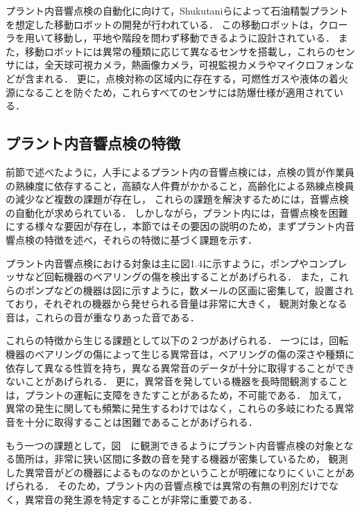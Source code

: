 \documentclass[../main]{subfiles}
\begin{document}
プラント内音響点検の自動化に向けて，Shukutaniらによって石油精製プラントを想定した移動ロボットの開発が行われている．
この移動ロボットは，クローラを用いて移動し，平地や階段を問わず移動できるように設計されている．
また，移動ロボットには異常の種類に応じて異なるセンサを搭載し，これらのセンサには，全天球可視カメラ，熱画像カメラ，可視監視カメラやマイクロフォンなどが含まれる．
更に，点検対称の区域内に存在する，可燃性ガスや液体の着火源になることを防ぐため，これらすべてのセンサには防爆仕様が適用されている．

\subsection{プラント内音響点検の特徴}
\label{sec:intro_plant_characteristics}

前節で述べたように，人手によるプラント内の音響点検には，点検の質が作業員の熟練度に依存すること，高額な人件費がかかること，高齢化による熟練点検員の減少など複数の課題が存在し，
これらの課題を解決するためには，音響点検の自動化が求められている．
しかしながら，プラント内には，音響点検を困難にする様々な要因が存在し，本節ではその要因の説明のため，まずプラント内音響点検の特徴を述べ，それらの特徴に基づく課題を示す．

プラント内音響点検における対象は主に図1.4に示すように，ポンプやコンプレッサなど回転機器のベアリングの傷を検出することがあげられる．
また，これらのポンプなどの機器は図に示すように，数メールの区画に密集して，設置されており，それぞれの機器から発せられる音量は非常に大きく，
観測対象となる音は，これらの音が重なりあった音である．

これらの特徴から生じる課題として以下の２つがあげられる．
一つには，回転機器のベアリングの傷によって生じる異常音は，ベアリングの傷の深さや種類に依存して異なる性質を持ち，異なる異常音のデータが十分に取得することができないことがあげられる．
更に，異常音を発している機器を長時間観測することは，プラントの運転に支障をきたすことがあるため，不可能である．
加えて，異常の発生に関しても頻繁に発生するわけではなく，これらの多岐にわたる異常音を十分に取得することは困難であることがあげられる．

もう一つの課題として，図　に観測できるようにプラント内音響点検の対象となる箇所は，非常に狭い区間に多数の音を発する機器が密集しているため，
観測した異常音がどの機器によるものなのかということが明確になりにくいことがあげられる．
そのため，プラント内の音響点検では異常の有無の判別だけでなく，異常音の発生源を特定することが非常に重要である．
\end{document}
